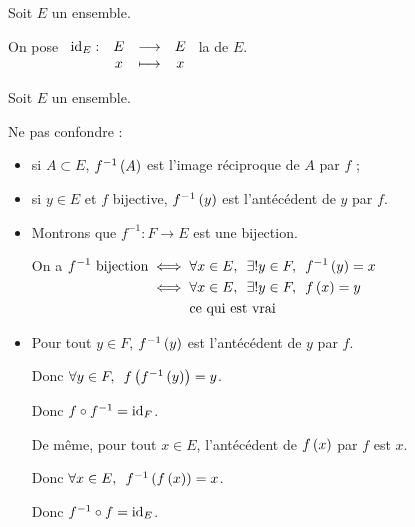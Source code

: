 \begin{oubli}
Soit \(E\) un ensemble.

On pose \(\begin{array}[t]{cccc}\mathrm{id}_{E} : & E & \longrightarrow & E \\ & x & \longmapsto & x\end{array}\) la  de \(E\).
\end{oubli}

\begin{rem}
Soit \(E\) un ensemble.

Ne pas confondre : \begin{itemize}
\item si \(A\subset E\), \(f^{-1}\left(A\right)\) est l'image réciproque de \(A\) par \(f\) ;

\item si \(y\in E\) et \(f\) bijective, \(f^{-1}\left(y\right)\) est l'antécédent de \(y\) par \(f\).
\end{itemize}
\end{rem}

\begin{dem}
\begin{itemize}
\item Montrons que \(f^{-1}:F\to E\) est une bijection.

On a \(\begin{aligned}[t]
f^{-1}\text{ bijection}&\ssi\quantifs{\forall x\in E;\exists! y\in F}f^{-1}\paren{y}=x \\
&\ssi\quantifs{\forall x\in E;\exists! y\in F}f\paren{x}=y \\
&\color{white}\iff\color{black}\text{ce qui est vrai}
\end{aligned}\)

\item Pour tout \(y\in F\), \(f^{-1}\left(y\right)\) est l'antécédent de \(y\) par \(f\).

Donc \(\quantifs{\forall y\in F}f\paren{f^{-1}\paren{y}}=y\).

Donc \(f\circ f^{-1}=\mathrm{id}_{F}\).

De même, pour tout \(x\in E\), l'antécédent de \(f\left(x\right)\) par \(f\) est \(x\).

Donc \(\quantifs{\forall x\in E}f^{-1}\paren{f\paren{x}}=x\).

Donc \(f^{-1}\circ f=\mathrm{id}_{E}\).
\end{itemize}
\end{dem}

